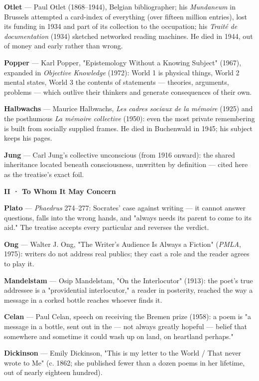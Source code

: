 \documentclass[11pt]{article}
\begin{document}
\textbf{Otlet} — Paul Otlet (1868–1944), Belgian bibliographer; his \emph{Mundaneum} in Brussels attempted a card-index of everything (over fifteen million entries), lost its funding in 1934 and part of its collection to the occupation; his \emph{Traité de documentation} (1934) sketched networked reading machines. He died in 1944, out of money and early rather than wrong.

\textbf{Popper} — Karl Popper, "Epistemology Without a Knowing Subject" (1967), expanded in \emph{Objective Knowledge} (1972): World 1 is physical things, World 2 mental states, World 3 the contents of statements — theories, arguments, problems — which outlive their thinkers and generate consequences of their own.

\textbf{Halbwachs} — Maurice Halbwachs, \emph{Les cadres sociaux de la mémoire} (1925) and the posthumous \emph{La mémoire collective} (1950): even the most private remembering is built from socially supplied frames. He died in Buchenwald in 1945; his subject keeps his pages.

\textbf{Jung} — Carl Jung's collective unconscious (from 1916 onward): the shared inheritance located beneath consciousness, unwritten by definition — cited here as the treatise's exact foil.

\textbf{II · To Whom It May Concern}

\textbf{Plato} — \emph{Phaedrus} 274–277: Socrates' case against writing — it cannot answer questions, falls into the wrong hands, and "always needs its parent to come to its aid." The treatise accepts every particular and reverses the verdict.

\textbf{Ong} — Walter J. Ong, "The Writer's Audience Is Always a Fiction" (\emph{PMLA}, 1975): writers do not address real publics; they cast a role and the reader agrees to play it.

\textbf{Mandelstam} — Osip Mandelstam, "On the Interlocutor" (1913): the poet's true addressee is a "providential interlocutor," a reader in posterity, reached the way a message in a corked bottle reaches whoever finds it.

\textbf{Celan} — Paul Celan, speech on receiving the Bremen prize (1958): a poem is "a message in a bottle, sent out in the — not always greatly hopeful — belief that somewhere and sometime it could wash up on land, on heartland perhaps."

\textbf{Dickinson} — Emily Dickinson, "This is my letter to the World / That never wrote to Me" (c. 1862; she published fewer than a dozen poems in her lifetime, out of nearly eighteen hundred).
\end{document}
